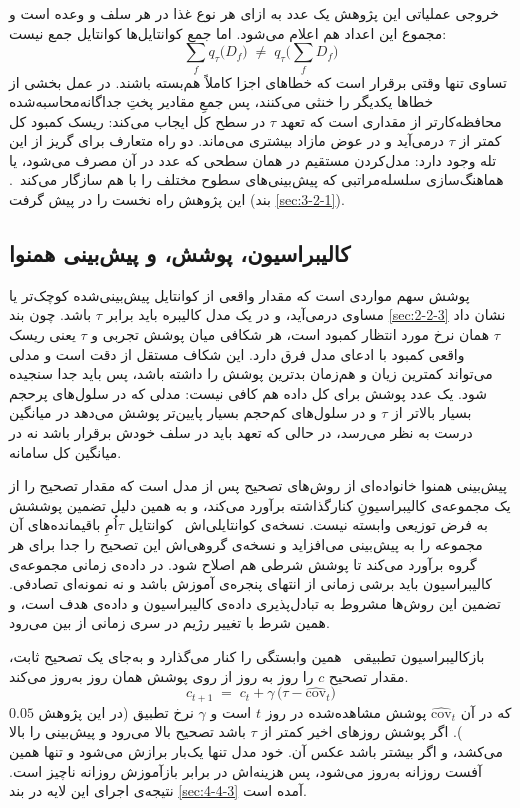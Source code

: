 خروجی عملیاتی این پژوهش یک عدد به ازای هر نوع غذا در هر سلف و وعده است و مجموع این
اعداد هم اعلام می‌شود. اما جمع کوانتایل‌ها کوانتایل جمع نیست:
\[ \sum_f q_\tau\big(D_f\big) \;\ne\; q_\tau\Big(\sum_f D_f\Big) \]
تساوی تنها وقتی برقرار است که خطاهای اجزا کاملاً هم‌بسته باشند. در عمل بخشی از خطاها
یکدیگر را خنثی می‌کنند، پس جمعِ مقادیر پختِ جداگانه‌محاسبه‌شده محافظه‌کارتر از مقداری است
که تعهد $\tau$ در سطح کل ایجاب می‌کند: ریسک کمبود کل کمتر از $\tau$ درمی‌آید و در عوض
مازاد بیشتری می‌ماند. دو راه متعارف برای گریز از این تله وجود دارد: مدل‌کردن مستقیم در
همان سطحی که عدد در آن مصرف می‌شود، یا هماهنگ‌سازی
سلسله‌مراتبی که پیش‌بینی‌های سطوح مختلف را با
هم سازگار می‌کند~\cite{Wickramasuriya19mint}. این پژوهش راه نخست را در پیش گرفت (بند
\ref{sec:3-2-1}).

\subsection{کالیبراسیون، پوشش، و پیش‌بینی همنوا}
\label{sec:2-3-4}

پوشش سهم مواردی است که مقدار واقعی از کوانتایل پیش‌بینی‌شده
کوچک‌تر یا مساوی درمی‌آید، و در یک مدل کالیبره باید برابر $\tau$ باشد. چون بند
\ref{sec:2-2-3} نشان داد $\tau$ همان نرخ مورد انتظار کمبود است، هر شکافی میان پوشش
تجربی و $\tau$ یعنی ریسک واقعی کمبود با ادعای مدل فرق دارد. این شکاف مستقل از دقت است و
مدلی می‌تواند کمترین زیان و هم‌زمان بدترین پوشش را داشته باشد، پس باید جدا سنجیده شود.
یک عدد پوشش برای کل داده هم کافی نیست: مدلی که در سلول‌های پرحجم بسیار بالاتر از $\tau$
و در سلول‌های کم‌حجم بسیار پایین‌تر پوشش می‌دهد در میانگین درست به نظر می‌رسد، در حالی که
تعهد باید در سلف خودش برقرار باشد نه در میانگین کل سامانه.

پیش‌بینی همنوا خانواده‌ای از روش‌های تصحیح پس از مدل
است که مقدار تصحیح را از یک مجموعه‌ی کالیبراسیونِ کنارگذاشته برآورد می‌کند، و به همین
دلیل تضمین پوششش به فرض توزیعی وابسته نیست. نسخه‌ی کوانتایلی‌اش~\cite{Romano19cqr}
کوانتایل $\tau$اُمِ باقیمانده‌های آن مجموعه را به پیش‌بینی می‌افزاید و نسخه‌ی گروهی‌اش این
تصحیح را جدا برای هر گروه برآورد می‌کند تا پوشش شرطی هم اصلاح شود. در داده‌ی زمانی
مجموعه‌ی کالیبراسیون باید برشی زمانی از انتهای پنجره‌ی آموزش باشد و نه نمونه‌ای تصادفی.
تضمین این روش‌ها مشروط به تبادل‌پذیری داده‌ی کالیبراسیون و
داده‌ی هدف است، و همین شرط با تغییر رژیم در سری زمانی از بین می‌رود.

بازکالیبراسیون تطبیقی~\cite{GibbsCandes21aci} همین وابستگی را کنار می‌گذارد و به‌جای یک
تصحیح ثابت، مقدار تصحیح $c$ را روز به روز از روی پوشش همان روز به‌روز می‌کند.
\begin{equation}
c_{t+1} \;=\; c_{t} + \gamma\,\big(\tau - \widehat{\mathrm{cov}}_{t}\big)
\label{eq:aci}
\end{equation}
که در آن $\widehat{\mathrm{cov}}_{t}$ پوشش مشاهده‌شده در روز $t$ است و $\gamma$ نرخ
تطبیق (در این پژوهش $0.05$). اگر پوشش روزهای اخیر کمتر از $\tau$ باشد تصحیح بالا می‌رود
و پیش‌بینی را بالا می‌کشد، و اگر بیشتر باشد عکس آن. خود مدل تنها یک‌بار برازش می‌شود و
تنها همین آفست روزانه به‌روز می‌شود، پس هزینه‌اش در برابر بازآموزش روزانه ناچیز است.
نتیجه‌ی اجرای این لایه در بند \ref{sec:4-4-3} آمده است.

